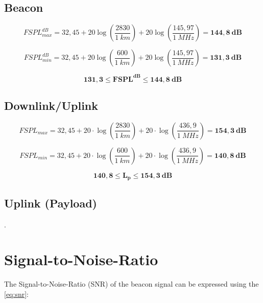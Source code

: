 \subsection{Beacon}

\begin{equation}
FSPL^{dB}_{max} = 32,45 + 20\log\left(\frac{2830}{1\ km}\right) + 20\log\left(\frac{145,97}{1\ MHz}\right) = \mathbf{144,8\ dB}
\end{equation}

\begin{equation}
FSPL^{dB}_{min} = 32,45 + 20\log\left(\frac{600}{1\ km}\right) + 20\log\left(\frac{145,97}{1\ MHz}\right) = \mathbf{131,3\ dB}
\end{equation}

\begin{equation}
\mathbf{131,3 \leq FSPL^{dB} \leq 144,8\ dB}
\end{equation}

\subsection{Downlink/Uplink}

\begin{equation}
FSPL_{max} = 32,45 + 20\cdot \log\left(\frac{2830}{1\ km}\right) + 20\cdot \log\left(\frac{436,9}{1\ MHz}\right) = \mathbf{154,3\ dB}
\end{equation}

\begin{equation}
FSPL_{min} = 32,45 + 20\cdot \log\left(\frac{600}{1\ km}\right) + 20\cdot \log\left(\frac{436,9}{1\ MHz}\right) = \mathbf{140,8\ dB}
\end{equation}

\begin{equation}
\mathbf{140,8 \leq L_{p} \leq 154,3\ dB}
\end{equation}

\subsection{Uplink (Payload)}

.

\section{Signal-to-Noise-Ratio}

The Signal-to-Noise-Ratio (SNR) of the beacon signal can be expressed using the \autoref{eq:snr}:

